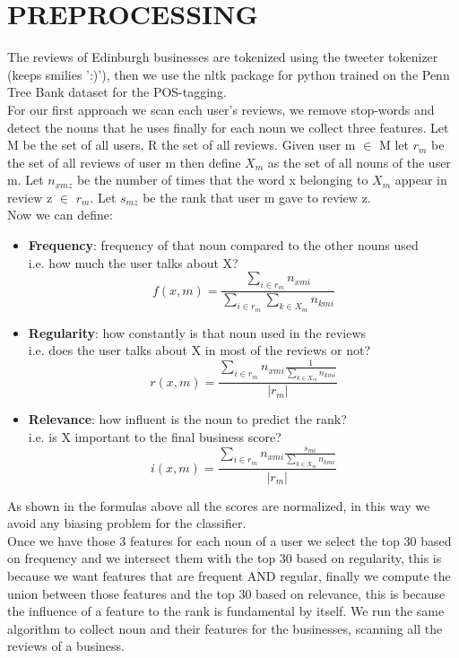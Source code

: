 \documentclass[11pt]{article}
\begin{document}
\section{PREPROCESSING}
The reviews of Edinburgh businesses are tokenized using the tweeter tokenizer (keeps smilies ':)'), then we use the nltk package for python trained on the  Penn Tree Bank dataset for the POS-tagging.\\
For our first approach we scan each user's reviews, we remove stop-words and detect the nouns that he uses finally for each noun we collect three features.
Let M be the set of all users, R the set of all reviews.
Given user m $\in$ M let $r_m$ be the set of all reviews of user m then define $X_m$ as the set of all nouns of the user m.
Let $n_{xmz}$ be the number of times that the word x belonging to $X_m$ appear in review z $\in$ $r_m.$
Let $s_{mz}$ be the rank that user m gave to review z.\\
Now we can define:
\begin{itemize}
	\item \textbf{Frequency}: frequency of that noun compared to the other nouns used\\
	i.e. how much the user talks about X?
	\[ f(x,m)= \frac{\sum_{i \in r_m}n_{xmi}}{\sum_{i \in r_m}\sum_{k \in X_m} n_{kmi}} \]
	\item \textbf{Regularity}: how constantly is that noun used in the reviews\\
	i.e. does the user talks about X in most of the reviews or not?
	\[ r(x,m)= \frac{\sum_{i \in r_m}
		n_{xmi}  \frac{1}{\sum_{k \in X_m}n_{kmi}}}	
	{|r_m|} \]
	\item \textbf{Relevance}: how influent is the noun to predict the rank?\\
	i.e. is X important to the final business score?
	\[ i(x,m)= \frac{\sum_{i \in r_m}
		n_{xmi}  \frac{s_{mi}}{\sum_{k \in X_m}n_{kmi}}}	
	{|r_m|} \]
\end{itemize}
As shown in the formulas above all the scores are normalized, in this way we avoid any biasing problem for the classifier.\\
Once we have those 3 features for each noun of a user we select the top 30 based on frequency and we intersect them with the top 30 based on regularity, this is because we want features that are frequent AND regular, finally we compute the union between those features and the top 30 based on relevance, this is because the influence of a feature to the rank is fundamental by itself. 
We run the same algorithm to collect noun and their features for the businesses, scanning all the reviews of a business.
\end{document}
